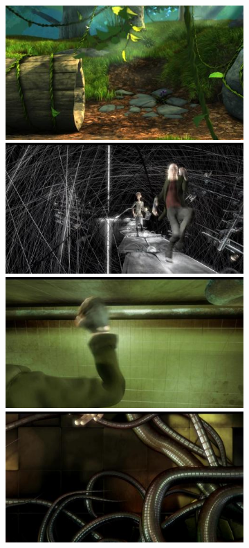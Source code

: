 \begin{figure}
\begin{subfigure}[t]{0.135\textwidth}
		\includegraphics[width=\textwidth]{figures/stereo/bbb_frame-0353-0}\\
		\includegraphics[width=\textwidth]{figures/stereo/ed_frame-0097-0}\\
		\includegraphics[width=\textwidth]{figures/stereo/ed_frame-0438-0}\\
		\includegraphics[width=\textwidth]{figures/stereo/ed_frame-0528-0}

\end{subfigure}
\end{figure}
